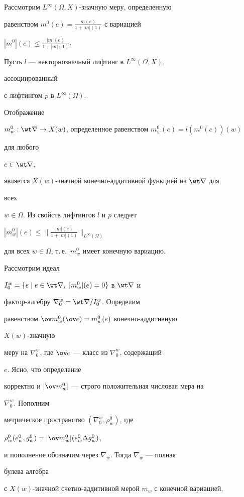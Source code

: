 \begin{pf} Рассмотрим $L^\infty(\Omega,X)$-значную меру, определенную 


равенством $m^0(e)=\frac{m(e)}{1+|m|(1)}$ с вариацией 


$|m^0|(e)\le\frac{|m|(e)}{1+|m|(1)}$. 


 


Пусть $l$ --- векторнозначный лифтинг в $L^\infty(\Omega,X)$, 


ассоциированный 


с лифтингом $p$ в $L^\infty(\Omega)$.


Отображение 


$m^0_w:\wt\nabla\to X(w)$, определенное равенством $m^0_w(e)=l(m^0(e))(w)$ 


для любого 


$e\in\wt\nabla$,


является $X(w)$-значной конечно-аддитивной функцией на $\wt\nabla$ для 


всех 


$w\in\Omega$. Из свойств лифтингов $l$ и $p$ следует 


$|m^0_w|(e)\le\Big\|\frac{|m|(e)}{1+|m|(1)}\Big\|_{L^\infty(\Omega)}$ 


для всех $w\in\Omega$, т.\,е.~$m^0_w$ имеет конечную вариацию. 


Рассмотрим идеал  


$I^w_0=\{e\mid e\in\wt\nabla,\ |m^0_w|(e)=0\}$ в $\wt\nabla$ и 


фактор-алгебру $\nabla^w_0=\wt\nabla/I^w_0$. Определим 


равенством $\ov m^0_w(\ov e)=m^0_w(e)$ конечно-аддитивную 


$X(w)$-значную  


меру на $\nabla^w_0$, где $\ov e$ --- класс из $\nabla^w_0$, содержащий 


$e$. Ясно, что определение  


корректно и $|\ov m^0_w|$ --- строго положительная числовая мера на 


$\nabla^w_0$. Пополним 


метрическое пространство $(\nabla^w_0,\rho^0_w)$, где 


$\rho^0_w(e^0_w,g^0_w)=|\ov m^0_w|(e^0_w\Delta g^0_w)$, 


и пополнение обозначим через $\nabla_w$. Тогда $\nabla_w$ --- полная 


булева алгебра  


с $X(w)$-значной счетно-аддитивной мерой $m_w$ с конечной вариацией,  



\end{pf}
